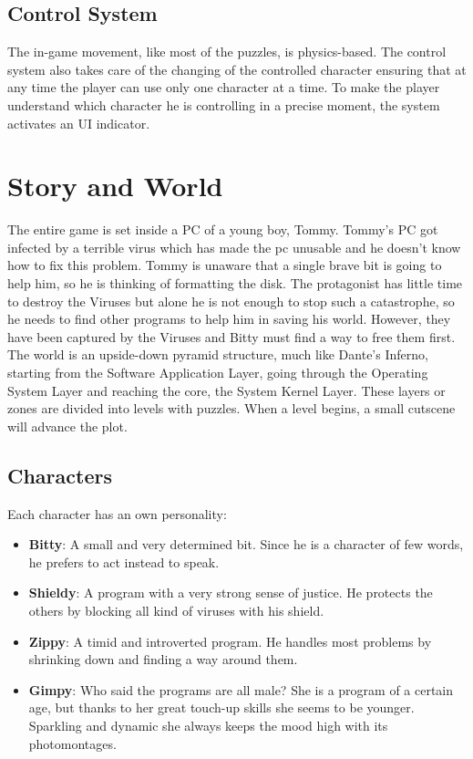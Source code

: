 \documentclass[12pt, a4paper]{report}
\begin{document}
\section*{Control System}
The in-game movement, like most of the puzzles, is physics-based. The control system also takes care of the changing of the controlled character ensuring that at any time the player can use only one character at a time. To make the player understand which character he is controlling in a precise moment, the system activates an UI indicator.



\chapter{Story and World}
The entire game is set inside a PC of a young boy, Tommy. Tommy’s PC got infected by a terrible virus which has made the pc unusable and he doesn’t know how to fix this problem. Tommy is unaware that a single brave bit is going to help him, so he is thinking of formatting the disk. The protagonist has little time to destroy the Viruses but alone he is not enough to stop such a catastrophe, so he needs to find other programs to help him in saving his world. However, they have been captured by the Viruses and Bitty must find a way to free them first.\\
The world is an upside-down pyramid structure, much like Dante’s Inferno, starting from the Software Application Layer, going through the Operating System Layer and reaching the core, the System Kernel Layer. These layers or zones are divided into levels with puzzles. When a level begins, a small cutscene will advance the plot.

\section*{Characters}
Each character has an own personality:
\begin{itemize}
\item \textbf{Bitty}: A small and very determined bit. Since he is a character of few words, he prefers to act instead to speak.
\item \textbf{Shieldy}: A program with a very strong sense of justice. He protects the others by blocking all kind of viruses with his shield.
\item \textbf{Zippy}: A timid and introverted program. He handles most problems by shrinking down and finding a way around them.
\item \textbf{Gimpy}: Who said the programs are all male? She is a program of a certain age, but thanks to her great touch-up skills she seems to be younger. Sparkling and dynamic she always keeps the mood high with its photomontages.
\end{itemize}
\end{document}
